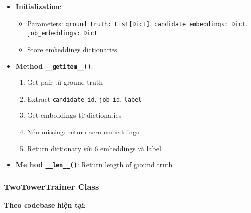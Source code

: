 \begin{itemize}
    \item \textbf{Initialization}:
    \begin{itemize}
        \item Parameters: \texttt{ground\_truth: List[Dict]}, \texttt{candidate\_embeddings: Dict}, \texttt{job\_embeddings: Dict}
        \item Store embeddings dictionaries
    \end{itemize}
    
    \item \textbf{Method \texttt{\_\_getitem\_\_()}}:
    \begin{enumerate}
        \item Get pair từ ground truth
        \item Extract \texttt{candidate\_id}, \texttt{job\_id}, \texttt{label}
        \item Get embeddings từ dictionaries
        \item Nếu missing: return zero embeddings
        \item Return dictionary với 6 embeddings và label
    \end{enumerate}
    
    \item \textbf{Method \texttt{\_\_len\_\_()}}: Return length of ground truth
\end{itemize}

\subsubsection{TwoTowerTrainer Class}

\textbf{Theo codebase hiện tại}:

